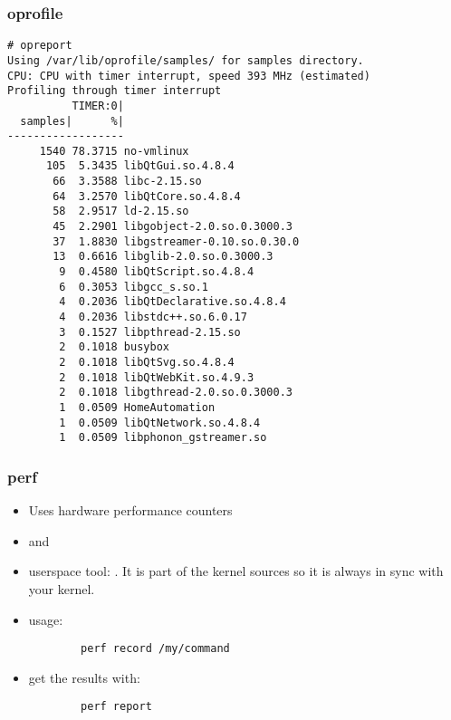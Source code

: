 \begin{frame}[fragile]
\frametitle{oprofile}
\begin{block}{}
\tiny
\begin{verbatim}
# opreport
Using /var/lib/oprofile/samples/ for samples directory.
CPU: CPU with timer interrupt, speed 393 MHz (estimated)
Profiling through timer interrupt
          TIMER:0|
  samples|      %|
------------------
     1540 78.3715 no-vmlinux
      105  5.3435 libQtGui.so.4.8.4
       66  3.3588 libc-2.15.so
       64  3.2570 libQtCore.so.4.8.4
       58  2.9517 ld-2.15.so
       45  2.2901 libgobject-2.0.so.0.3000.3
       37  1.8830 libgstreamer-0.10.so.0.30.0
       13  0.6616 libglib-2.0.so.0.3000.3
        9  0.4580 libQtScript.so.4.8.4
        6  0.3053 libgcc_s.so.1
        4  0.2036 libQtDeclarative.so.4.8.4
        4  0.2036 libstdc++.so.6.0.17
        3  0.1527 libpthread-2.15.so
        2  0.1018 busybox
        2  0.1018 libQtSvg.so.4.8.4
        2  0.1018 libQtWebKit.so.4.9.3
        2  0.1018 libgthread-2.0.so.0.3000.3
        1  0.0509 HomeAutomation
        1  0.0509 libQtNetwork.so.4.8.4
        1  0.0509 libphonon_gstreamer.so
\end{verbatim}
\end{block}
\end{frame}

\begin{frame}[fragile]
\frametitle{perf}
\begin{itemize}
	\item Uses hardware performance counters
	\item {} and 
	\item userspace tool: . It is part of the kernel
		sources so it is always in sync with your kernel.
	\item usage:
	\begin{block}{}
	\begin{verbatim}
		perf record /my/command
	\end{verbatim}
	\end{block}
	\item get the results with:
	\begin{block}{}
	\begin{verbatim}
		perf report
	\end{verbatim}
	\end{block}
\end{itemize}
\end{frame}

